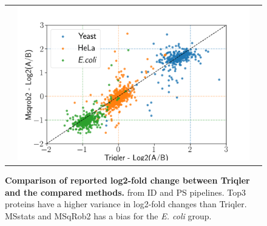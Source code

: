 \documentclass[11pt]{article}
\begin{document}
\begin{figure}[hbt]
\begin{tabular}{   >{\centering\arraybackslash} m{3cm} V V}
                & \includegraphics[width=\linewidth]{../../result/report_plots_pipeline/scatter_ID_triqler_vs_msqrob2.png} \\ 
    \end{tabular}
    \caption{{\bf Comparison of reported log2-fold change between Triqler and the compared methods.} from ID and PS pipelines. Top3 proteins have a higher variance in log2-fold changes than Triqler. MSstats and MSqRob2 has a bias for the \textit{E. coli} group. \label{fig:fc_scatter_triqler_vs_method_supplement}}
   
\end{figure}
\end{document}
